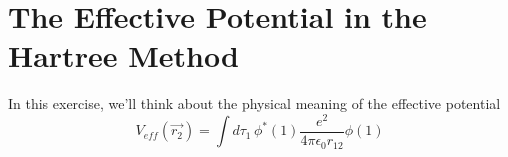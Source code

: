 %
%
%
%

\section*{The Effective Potential in the Hartree Method}
	
	In this exercise, we'll think about the physical meaning of the effective potential 
			\begin{equation*}
				V_{eff}(\vec{r_2}) = \int d\tau_1 \, \phi^*(1)\frac{e^2}{4\pi \epsilon_0 r_{12}} \phi(1)
			\end{equation*}

